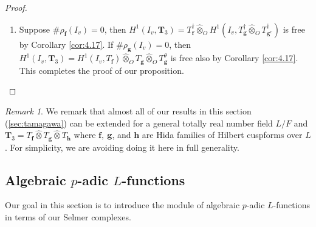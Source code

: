 \documentclass[10pt]{amsart}
\numberwithin{equation}{section}
\theoremstyle{definition}
\theoremstyle{remark} %
\newtheorem{rmk}[thm]{Remark}
\newcommand{\bs}{\boldsymbol}
\newcommand{\mbf}{\mathbf}
\newcommand{\GL}[1]{\operatorname{GL}_{#1}}
\newcommand{\f}{\mathbf{f}}
\newcommand{\g}{\mathbf{g}}
\newcommand{\R}{\mathcal{R}}
\newcommand{\T}{\mathbf{T}}
\newcommand{\hotimes}{\widehat{\otimes}}
\begin{document}
\begin{proof}
\begin{enumerate}
			$I_v^{(p)}$ acts trivially on $T_{\f}$ and $T_{\g}$ by Proposition \ref{prop:4.16}. Hence we get 
			\[
			\rho_{\spadesuit}(t) = 
			\begin{pmatrix}
				1 & a_{\spadesuit}
				\\
				0 & 1
			\end{pmatrix}  \,,\qquad \spadesuit \in \{\f, \g, \g^\theta\}
			\]
			in $\GL{\R_{\spadesuit}}(T_{\spadesuit}) \cong \GL{2}(\R_{\spadesuit})$. 
			Moreover, via the proof of Corollary \ref{cor:4.17} we have $a_{\spadesuit} \in \R_{\spadesuit}^\times$. Hence the double coset 
			$\GL{8}(\R)\ (\bs{\rho}_3(t) - 1)\ \GL{8}(\R)$ is given by the matrix 
			\[
			\begin{pmatrix}
				0 & 1 & 0&&&&&
				\\
				&  0& 0&1&&&&
				\\
				& & 0&0&1&&&
				\\
				& & &0&0&1&&
				\\
				&  & &&0&0&1&
				\\
				&&&&&0&0&1
				\\
				&& &&&&0&0
				\\
				&  & &&&&&0
			\end{pmatrix}\,. 
			\]
			This gives us $H^1(I_v,\T_3)$ is free, as required. 
			
			\item Suppose $\#\rho_{\f}(I_v) = 0$, then $H^1(I_v, \T_3) = T_\f^{\dagger} \widehat{\otimes}_{O} H^1(I_v, T_{\g}^{\dagger}\widehat{\otimes}_{O} T_{\g^{c}}^{\dagger})$ is free by Corollary \ref{cor:4.17}. 
			If $\#\rho_{\g}(I_v) = 0$, then $H^1(I_v, \T_3) = H^1(I_v, T_\f)\widehat{\otimes}_{O} T_{\g}\widehat{\otimes}_{O} T_{\g}^{\theta}$ is free also by Corollary \ref{cor:4.17}. This completes the proof of our proposition. 
		\end{enumerate}
		
	\end{proof}
	\begin{rmk}
		We remark that almost all of our results in this section (\textsection \ref{sec:tamagawa}) can be extended for a general totally real number field $ L/F $ and $ \T_3 = T_\f \hotimes T_\g \hotimes T_{\mbf h} $ where $ \f, \ \g $, and $ \mbf h $ are Hida families of Hilbert cuspforms over $ L $. For simplicity, we are avoiding doing it here in full generality.
	\end{rmk}
	
	\subsection{Algebraic $ p $-adic $ L $-functions}
	Our goal in this section is to introduce the module of algebraic $ p $-adic $ L $-functions in terms of our Selmer complexes.
\end{document}
